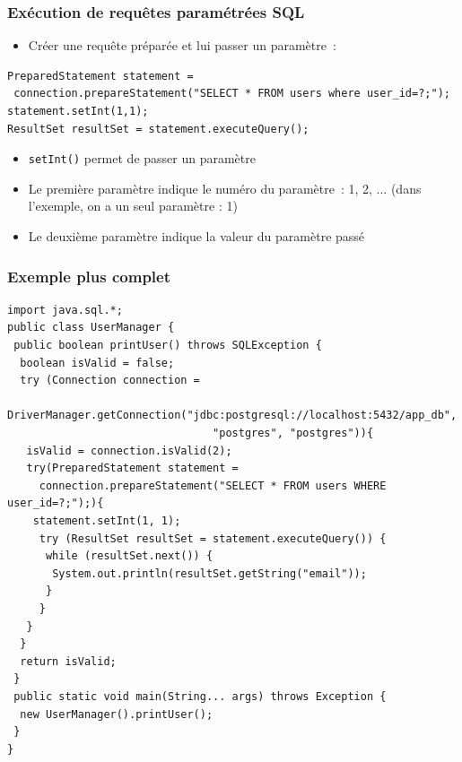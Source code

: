 \documentclass[aspectratio=169,10pt]{beamer}
\begin{document}
\begin{frame}[fragile]
	\frametitle{Exécution de requêtes paramétrées SQL}
	\begin{itemize}
		\item Créer une requête préparée et lui passer un paramètre~:
	\end{itemize}
\begin{lstlisting}
PreparedStatement statement = 
 connection.prepareStatement("SELECT * FROM users where user_id=?;");
statement.setInt(1,1);
ResultSet resultSet = statement.executeQuery();
\end{lstlisting}	
	\begin{itemize}
		\item \texttt{setInt()} permet de passer un paramètre
		\item Le première paramètre indique le numéro du paramètre~: 1, 2, ... (dans l'exemple, on a un seul paramètre : 1)
		\item Le deuxième paramètre indique la valeur du paramètre passé
	\end{itemize}
\end{frame}

\begin{frame}[fragile]
	\frametitle{Exemple plus complet}
\begin{lstlisting}[basicstyle=\lstcode\tiny]
import java.sql.*;	
public class UserManager {
 public boolean printUser() throws SQLException {
  boolean isValid = false;
  try (Connection connection = 
    DriverManager.getConnection("jdbc:postgresql://localhost:5432/app_db", 
                                "postgres", "postgres")){
   isValid = connection.isValid(2);
   try(PreparedStatement statement = 
     connection.prepareStatement("SELECT * FROM users WHERE user_id=?;");){
    statement.setInt(1, 1);
     try (ResultSet resultSet = statement.executeQuery()) {
      while (resultSet.next()) {
       System.out.println(resultSet.getString("email"));
      }
     }
   }
  }
  return isValid;
 }	
 public static void main(String... args) throws Exception {
  new UserManager().printUser();
 }
}
\end{lstlisting}
\end{frame}
\end{document}
